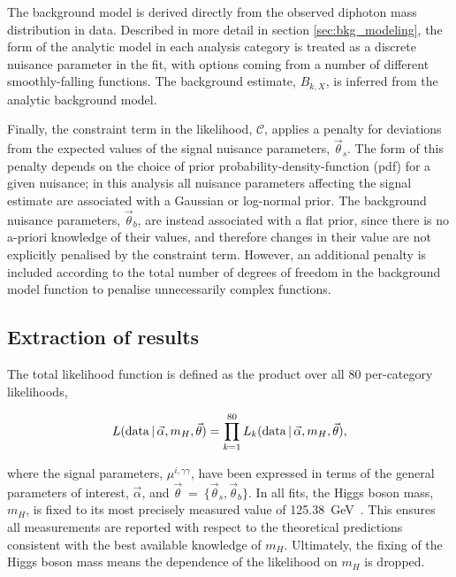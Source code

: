 The background model is derived directly from the observed diphoton mass distribution in data. Described in more detail in section \ref{sec:bkg_modeling}, the form of the analytic model in each analysis category is treated as a discrete nuisance parameter in the fit, with options coming from a number of different smoothly-falling functions. The background estimate, $B_{k,X}$, is inferred from the analytic background model.

Finally, the constraint term in the likelihood, $\mathcal{C}$, applies a penalty for deviations from the expected values of the signal nuisance parameters, $\vec{\theta}_s$. The form of this penalty depends on the choice of prior probability-density-function (pdf) for a given nuisance; in this analysis all nuisance parameters affecting the signal estimate are associated with a Gaussian or log-normal prior. The background nuisance parameters, $\vec{\theta}_b$, are instead associated with a flat prior, since there is no a-priori knowledge of their values, and therefore changes in their value are not explicitly penalised by the constraint term. However, an additional penalty is included according to the total number of degrees of freedom in the background model function to penalise unnecessarily complex functions. 

\newpage
\subsection{Extraction of results}\label{sec:results_extraction}
The total likelihood function is defined as the product over all 80 per-category likelihoods,

\begin{equation}
    L({\rm{data}}\,|\,\vec{\alpha},m_H,\vec{\theta}) = \prod_{k=1}^{80}  L_k({\rm{data}}\,|\,\vec{\alpha},m_H,\vec{\theta}),
\end{equation}

\noindent
where the signal parameters, $\mu^{i,\gamma\gamma}$, have been expressed in terms of the general parameters of interest, $\vec{\alpha}$, and $\vec{\theta}$~=~$\{\vec{\theta}_s,\vec{\theta}_b\}$. In all fits, the Higgs boson mass, $m_H$, is fixed to its most precisely measured value of 125.38~GeV~\cite{Sirunyan:2020xwk}. This ensures all measurements are reported with respect to the theoretical predictions consistent with the best available knowledge of $m_H$. Ultimately, the fixing of the Higgs boson mass means the dependence of the likelihood on $m_H$ is dropped.

